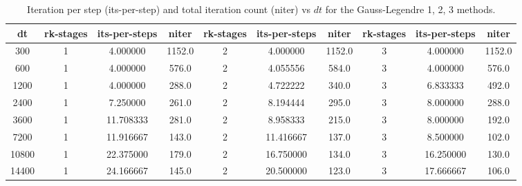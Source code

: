 \documentclass[a4paper, 12pt]{article}
\begin{document}
\begin{table}[h]\centering
\begin{scriptsize}
 \begin{tabular}{c||c|c|c||c|c|c||c|c|c}
   dt & rk-stages  &  its-per-steps  &   niter  &  rk-stages  &  its-per-steps  &   niter  &  rk-stages  &  its-per-steps  &   niter\\ \hline
  300  &          1    &     4.000000  &  1152.0    &    2   &    4.000000  &  1152.0   &      3   &      4.000000  &  1152.0 \\
   600  &         1     &    4.000000  &   576.0    &    2    &   4.055556  &   584.0    &     3    &     4.000000   &  576.0 \\
  1200   &         1   &      4.000000   &  288.0   &    2   &      4.722222  &   340.0    &        3    &     6.833333  &   492.0\\
  2400    &        1    &     7.250000   &  261.0   &    2   &       8.194444   &  295.0    &        3    &     8.000000   &  288.0\\
  3600     &       1    &    11.708333  &   281.0   &    2   &    8.958333   &  215.0     &       3    &     8.000000  &   192.0 \\
  7200     &       1   &     11.916667  &   143.0    &   2   &     11.416667  &   137.0    &        3   &      8.500000  &   102.0\\
  10800    &        1   &     22.375000 &    179.0   &   2   &     16.750000   &  134.0    &        3     &   16.250000   &  130.0 \\
  14400    &        1   &     24.166667  &   145.0   &   2   &     20.500000   &  123.0     &       3     &   17.666667   &  106.0
\end{tabular}
\caption{Iteration per step (its-per-step) and total iteration count (niter) vs $dt$ for the Gauss-Legendre 1, 2, 3 methods.}
\label{tab_niter_vs_dt}
\end{scriptsize}
\end{table}
\end{document}
